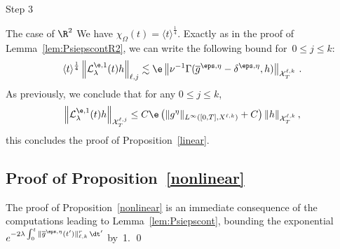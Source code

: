 \begin{step}{Step 3}
\begin{laststep}{The case of $\R^2$}
We have $\chi_\Omega(t) = \langle t \rangle^{\frac14} $. Exactly as in the proof of Lemma~\ref{lem:PsiepscontR2}, we can write the following bound for~$0\leq j \leq k$:
\[
\langle t \rangle^{\frac14} \left\|\mathcal{L}_\lambda^{\e,1}(t)h\right\|_{{\ell,j}}
\lesssim \e \left\| \nu^{-1} \Gamma (\overline g^{\eps,\eta}-\delta^{\eps,\eta},h) \right\|_{\mathcal{X}_T^{\ell,k} }\,.
\]
As previously, we conclude that for any $0 \le j \le k$,
\[
\left\| \mathcal{L}_\lambda^{\e,1}(t)h \right\|_{\mathcal{X}_T^{\ell,j} } \le C\e \left(\|{g^\eta} \|_{L^\infty([0,T], X^{\ell,k})} +C\right) \|h\|_{\mathcal{X}_T^{\ell,k} }\,,
\]
this concludes the proof of Proposition~\ref{linear}.
\end{laststep}
\end{step}

\subsection{Proof of Proposition~\ref{nonlinear}}
The proof of Proposition~\ref{nonlinear} is an immediate consequence of the computations leading to Lemma~\ref{lem:Psiepscont}, bounding the exponential~$e^{-2\lambda \int_0^t \|\overline g^{\eps,\eta}(t')\|_{\ell,k}^r\, \dt' } $ by~1.
\qed


